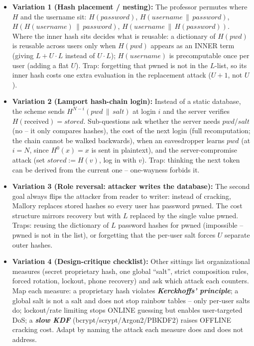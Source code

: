 \documentclass[12pt, a4paper]{article}
\newcommand{\term}[1]{\textbf{\textit{#1}}}        %
\begin{document}
\begin{trapbox}
\begin{itemize}
    \item \textbf{Variation 1 (Hash placement / nesting):} The professor permutes where $H$ and the username sit: $H(password)$, $H(username \,\|\, password)$, $H(H(username) \,\|\, password)$, $H(username \,\|\, H(password))$. Where the inner hash sits decides what is reusable: a dictionary of $H(pwd)$ is reusable across users only when $H(pwd)$ appears as an INNER term (giving $L + U \cdot L$ instead of $U \cdot L$); $H(username)$ is precomputable once per user (adding a flat $U$). Trap: forgetting that pwned is not in the $L$-list, so its inner hash costs one extra evaluation in the replacement attack ($U + 1$, not $U$).
    \item \textbf{Variation 2 (Lamport hash-chain login):} Instead of a static database, the scheme sends $H^{N-i}(pwd \,\|\, salt)$ at login $i$ and the server verifies $H(\text{received}) = stored$. Sub-questions ask whether the server needs $pwd$/$salt$ (no -- it only compares hashes), the cost of the next login (full recomputation; the chain cannot be walked backwards), when an eavesdropper learns $pwd$ (at $i = N$, since $H^{0}(x) = x$ is sent in plaintext), and the server-compromise attack (set $stored := H(v)$, log in with $v$). Trap: thinking the next token can be derived from the current one -- one-wayness forbids it.
    \item \textbf{Variation 3 (Role reversal: attacker writes the database):} The second goal always flips the attacker from reader to writer: instead of cracking, Mallory replaces stored hashes so every user has password pwned. The cost structure mirrors recovery but with $L$ replaced by the single value pwned. Traps: reusing the dictionary of $L$ password hashes for pwned (impossible -- pwned is not in the list), or forgetting that the per-user salt forces $U$ separate outer hashes.
    \item \textbf{Variation 4 (Design-critique checklist):} Other sittings list organizational measures (secret proprietary hash, one global ``salt'', strict composition rules, forced rotation, lockout, phone recovery) and ask which attack each counters. Map each measure: a proprietary hash violates \term{Kerckhoffs' principle}; a global salt is not a salt and does not stop rainbow tables -- only per-user salts do; lockout/rate limiting stops ONLINE guessing but enables user-targeted DoS; a \term{slow KDF} (bcrypt/scrypt/Argon2/PBKDF2) raises OFFLINE cracking cost. Adapt by naming the attack each measure does and does not address.
\end{itemize}
\end{trapbox}
\end{document}
